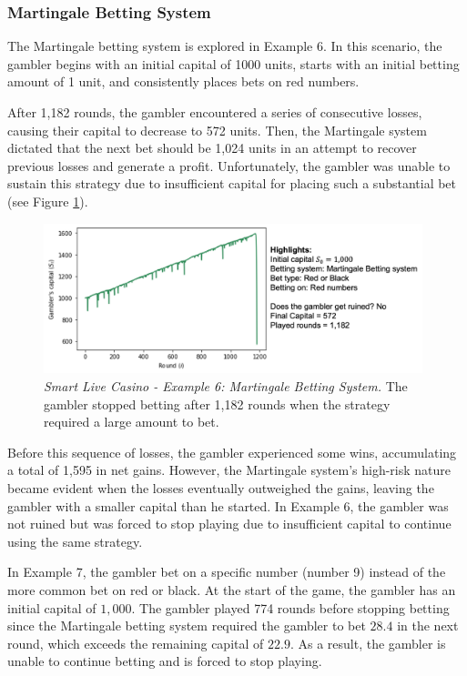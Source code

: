 \documentclass[11pt,twoside]{article}
\numberwithin{Theorem}{section}
\numberwithin{Definition}{section}
\numberwithin{Lemma}{section}
\numberwithin{Algorithm}{section}
\numberwithin{equation}{section}
\begin{document}
\subsubsection{Martingale Betting System}
The Martingale betting system is explored in Example 6. In this scenario, the gambler begins with an initial capital of 1000 units, starts with an initial betting amount of 1 unit, and consistently places bets on red numbers.

After 1,182 rounds, the gambler encountered a series of consecutive losses, causing their capital to decrease to 572 units. Then, the Martingale system dictated that the next bet should be 1,024 units in an attempt to recover previous losses and generate a profit. Unfortunately, the gambler was unable to sustain this strategy due to insufficient capital for placing such a substantial bet (see Figure \ref{sim_live_04}).

\begin{figure}[H]
    \centering
    \includegraphics[width=11cm]{sim_04.png}
    \caption[Smart Live Casino - Example 6: Martingale Betting System]{\textit{Smart Live Casino - Example 6: Martingale Betting System.} The gambler stopped betting after 1,182 rounds when the strategy required a large amount to bet.}\label{sim_live_04}
\end{figure}
Before this sequence of losses, the gambler experienced some wins, accumulating a total of 1,595 in net gains. However, the Martingale system's high-risk nature became evident when the losses eventually outweighed the gains, leaving the gambler with a smaller capital than he started. In Example 6, the gambler was not ruined but was forced to stop playing due to insufficient capital to continue using the same strategy.

In Example 7, the gambler bet on a specific number (number 9) instead of the more common bet on red or black. At the start of the game, the gambler has an initial capital of $1,000$. The gambler played 774 rounds before stopping betting since the Martingale betting system required the gambler to bet $28.4$ in the next round, which exceeds the remaining capital of $22.9$. As a result, the gambler is unable to continue betting and is forced to stop playing.
\end{document}
